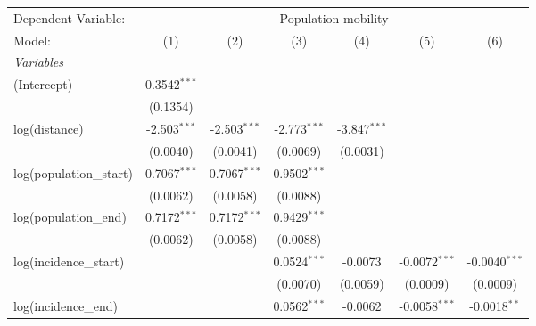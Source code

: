 \documentclass[10pt,a4paper]{article}
\author{Peer Lasse Hinrichsen}
\begin{document}
\begingroup
\centering
\begin{tabular}{lcccccc}
   \tabularnewline \midrule \midrule
   Dependent Variable: & \multicolumn{6}{c}{Population mobility}\\
   Model:                                           & (1)            & (2)            & (3)             & (4)            & (5)             & (6)\\  
   \midrule
   \emph{Variables}\\
   (Intercept)                                      & 0.3542$^{***}$ &                &                 &                &                 &   \\   
                                                    & (0.1354)       &                &                 &                &                 &   \\   
   log(distance)                                    & -2.503$^{***}$ & -2.503$^{***}$ & -2.773$^{***}$  & -3.847$^{***}$ &                 &   \\   
                                                    & (0.0040)       & (0.0041)       & (0.0069)        & (0.0031)       &                 &   \\   
   log(population\_start)                           & 0.7067$^{***}$ & 0.7067$^{***}$ & 0.9502$^{***}$  &                &                 &   \\   
                                                    & (0.0062)       & (0.0058)       & (0.0088)        &                &                 &   \\   
   log(population\_end)                             & 0.7172$^{***}$ & 0.7172$^{***}$ & 0.9429$^{***}$  &                &                 &   \\   
                                                    & (0.0062)       & (0.0058)       & (0.0088)        &                &                 &   \\   
   log(incidence\_start)                            &                &                & 0.0524$^{***}$  & -0.0073        & -0.0072$^{***}$ & -0.0040$^{***}$\\   
                                                    &                &                & (0.0070)        & (0.0059)       & (0.0009)        & (0.0009)\\   
   log(incidence\_end)                              &                &                & 0.0562$^{***}$  & -0.0062        & -0.0058$^{***}$ & -0.0018$^{**}$\\   

\end{tabular}
\end{document}
